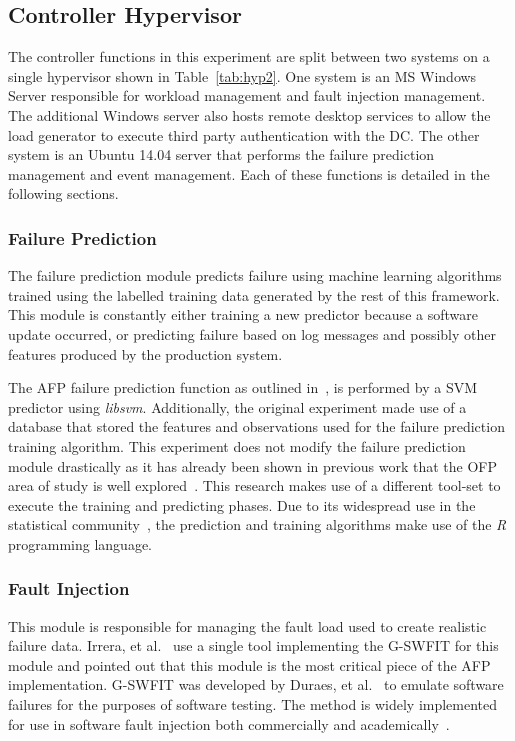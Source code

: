 \setcounter{secnumdepth}{5}

\subsection{Controller Hypervisor} \label{sec:controller} %
The controller functions in this experiment are split between two systems on a
single hypervisor shown in Table~\ref{tab:hyp2}.  One system is an \ac{MS}
Windows Server responsible for workload management and fault injection
management.  The additional Windows server also hosts remote desktop services
to allow the load generator to execute third party authentication with the
\ac{DC}.  The other system is an Ubuntu 14.04 server that performs the failure
prediction management and event management.  Each of these functions is
detailed in the following sections.

\subsubsection{Failure Prediction} \label{sec:failurePrediction} %
The failure prediction module predicts failure using machine learning
algorithms trained using the labelled training data generated by the rest of
this framework.  This module is constantly either training a new predictor
because a software update occurred, or predicting failure based on log messages
and possibly other features produced by the production system.

The \ac{AFP} failure prediction function as outlined in~\cite{irrera2015}, is
performed by a \ac{SVM} predictor using \emph{libsvm}.  Additionally, the
original experiment made use of a database that stored the features and
observations used for the failure prediction training algorithm.  This
experiment does not modify the failure prediction module drastically as it has
already been shown in previous work that the \ac{OFP} area of study is well
explored~\cite{salfnerSurvey}.  This research makes use of a different tool-set
to execute the training and predicting phases.  Due to its widespread use in
the statistical community~\cite{islr}, the prediction and training algorithms
make use of the \emph{R} programming language.

\subsubsection{Fault Injection} \label{sec:faultInjectionMgr}
This module is responsible for managing the fault load used to create realistic
failure data.  Irrera, et al.~\cite{irrera2015} use a single tool implementing
the \ac{G-SWFIT} for this module and pointed out that this module is the most
critical piece of the \ac{AFP} implementation.  \ac{G-SWFIT} was developed by
Duraes, et al.~\cite{gswfit} to emulate software failures for the purposes of
software testing.  The method is widely implemented for use in software fault
injection both commercially and
academically~\cite{natella2010,irrera2014,cotroneo2012,umadevi2015}.  

